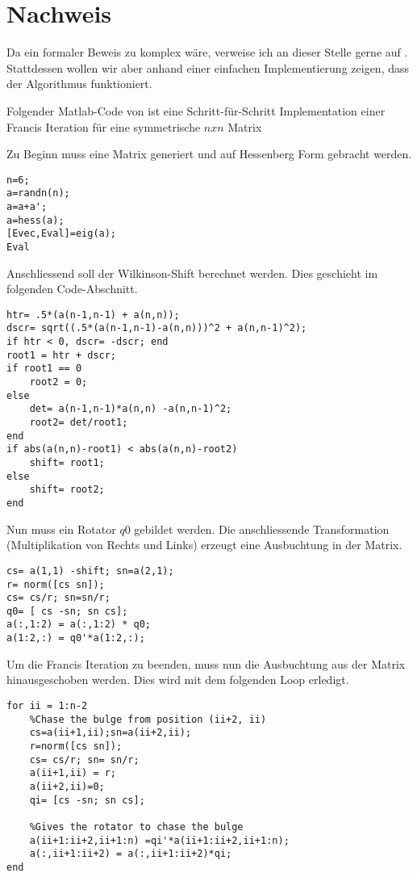 \section{Nachweis\label{francis:section:nachweis}}

Da ein formaler Beweis zu komplex wäre, verweise ich an dieser Stelle gerne auf \cite{francis:watkins_book}.
Stattdessen wollen wir aber anhand einer einfachen Implementierung zeigen, dass der Algorithmus funktioniert.

Folgender Matlab-Code von \cite{francis:watkins_book} ist eine Schritt-für-Schritt Implementation einer Francis Iteration für eine symmetrische $n x n$ Matrix 

Zu Beginn muss eine Matrix generiert und auf Hessenberg Form gebracht werden.
	
\begin{lstlisting}
n=6;
a=randn(n);
a=a+a';
a=hess(a);
[Evec,Eval]=eig(a);
Eval
\end{lstlisting}

Anschliessend soll der Wilkinson-Shift berechnet werden.
Dies geschieht im folgenden Code-Abschnitt.

\begin{lstlisting}
htr= .5*(a(n-1,n-1) + a(n,n));                          
dscr= sqrt((.5*(a(n-1,n-1)-a(n,n)))^2 + a(n,n-1)^2);    
if htr < 0, dscr= -dscr; end                            
root1 = htr + dscr;                                     
if root1 == 0                                         
	root2 = 0;
else                                                    
	det= a(n-1,n-1)*a(n,n) -a(n,n-1)^2;                 
	root2= det/root1;
end
if abs(a(n,n)-root1) < abs(a(n,n)-root2)
	shift= root1;
else
	shift= root2;
end
\end{lstlisting}

Nun muss ein Rotator $q0$ gebildet werden.
Die anschliessende Transformation (Multiplikation von Rechts und Links) erzeugt eine Ausbuchtung in der Matrix.

\begin{lstlisting}
cs= a(1,1) -shift; sn=a(2,1);
r= norm([cs sn]);
cs= cs/r; sn=sn/r;              
q0= [ cs -sn; sn cs];           
a(:,1:2) = a(:,1:2) * q0;
a(1:2,:) = q0'*a(1:2,:);
\end{lstlisting}

Um die Francis Iteration zu beenden, muss nun die Ausbuchtung aus der Matrix hinausgeschoben werden.
Dies wird mit dem folgenden Loop erledigt.

\begin{lstlisting}
for ii = 1:n-2
	%Chase the bulge from position (ii+2, ii)
	cs=a(ii+1,ii);sn=a(ii+2,ii);
	r=norm([cs sn]);
	cs= cs/r; sn= sn/r;
	a(ii+1,ii) = r;
	a(ii+2,ii)=0;
	qi= [cs -sn; sn cs];
	
	%Gives the rotator to chase the bulge
	a(ii+1:ii+2,ii+1:n) =qi'*a(ii+1:ii+2,ii+1:n);
	a(:,ii+1:ii+2) = a(:,ii+1:ii+2)*qi;
end
\end{lstlisting}

